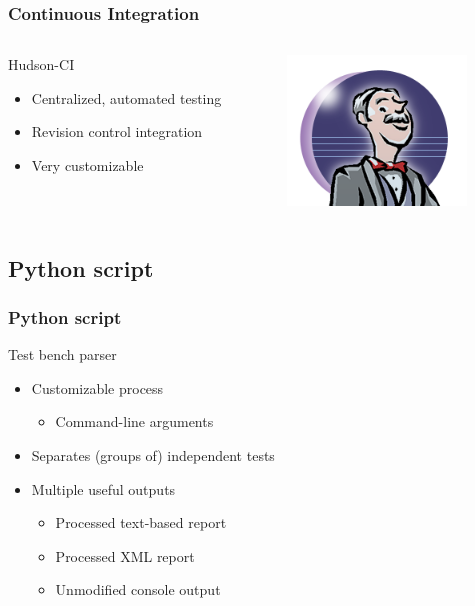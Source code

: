 \documentclass[british,10pt]{beamer}
\begin{document}
\begin{frame}\frametitle{Continuous Integration}
\begin{columns}
\begin{column}{0.6\textwidth}
Hudson-CI
\begin{itemize}
\item Centralized, automated testing
\item Revision control integration
\item Very customizable
\end{itemize}
\end{column}
\includegraphics[width=0.8\textwidth]{images/hudson.png}
\end{columns}
\end{frame}

\subsection{Python script}

\begin{frame}\frametitle{Python script}
Test bench parser
\begin{itemize}
\item Customizable process
\begin{itemize}
\item Command-line arguments
\end{itemize}
\item Separates (groups of) independent tests
\item Multiple useful outputs
\begin{itemize}
\item Processed text-based report
\item Processed XML report
\item Unmodified console output
\end{itemize}
\end{itemize}
\end{frame}
\end{document}
